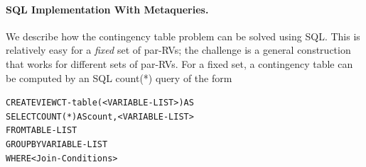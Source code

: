 
\paragraph{SQL Implementation With Metaqueries.}
We describe how the contingency table problem can be solved using SQL. %
This is relatively easy for a {\em fixed} set of par-RVs; the challenge is a general construction that works for different sets of par-RVs. For a fixed set, a  contingency table can be computed by an SQL count(*) query of the form 
%
%
\begin{alltt}
CREATE VIEW CT-table(<VARIABLE-LIST>) AS
SELECT COUNT(*) AS count, <VARIABLE-LIST>
FROM TABLE-LIST
GROUP BY VARIABLE-LIST
WHERE <Join-Conditions>
\end{alltt}

